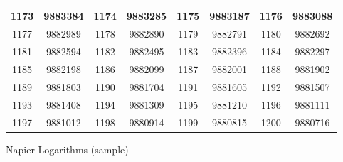 \documentclass{exam}
\begin{document}
\begin{figure}
\begin{tabular}{|c|c||c|c||c|c||c|c|}
1173 & 9883384 &1174 & 9883285 &1175 & 9883187 &1176 & 9883088 \\
\hline
1177 & 9882989 &1178 & 9882890 &1179 & 9882791 &1180 & 9882692 \\
\hline
1181 & 9882594 &1182 & 9882495 &1183 & 9882396 &1184 & 9882297 \\
\hline
1185 & 9882198 &1186 & 9882099 &1187 & 9882001 &1188 & 9881902 \\
\hline
1189 & 9881803 &1190 & 9881704 &1191 & 9881605 &1192 & 9881507 \\
\hline
1193 & 9881408 &1194 & 9881309 &1195 & 9881210 &1196 & 9881111 \\
\hline
1197 & 9881012 &1198 & 9880914 &1199 & 9880815 &1200 & 9880716 \\
\hline


\hline
\end{tabular}

\caption{Napier Logarithms (sample)}
\end{figure}
\end{document}
